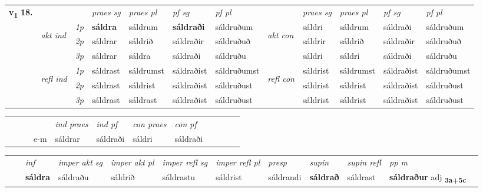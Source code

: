 \begin{tabular}{llllllllllll} \toprule
\multirow{4}{*}{{{\textbf{v{\textsubscript{1}}} \Large{\textbf{18.}}}}}  & &   &  \textit{praes sg}  & \textit{praes pl}  &\textit{ pf sg} & \textit{pf pl} &  &  \textit{praes sg}  & \textit{praes pl}  & \textit{pf sg} & \textit{pf pl } \\*
	\cmidrule{4-7} \cmidrule{9-12}
 & \multirow{3}{*}{\begin{turn}{90}\textit{akt ind}\end{turn}} & {\textit{1p}} & \textbf{sáldra} & sáldrum    & \textbf{sáldraði} & sáldruðum & \multirow{3}{*}{\begin{turn}{90}\textit{akt con}\end{turn}} &sáldri & sáldrum & sáldraði & sáldruðum\\*
& &  {\textit{2p}} &  sáldrar  & sáldrið   & sáldraðir & sáldruðuð & & sáldrir & sáldrið & sáldraðir & sáldruðuð \\*
& &  {\textit{3p}} & sáldrar & sáldra   & sáldraði & sáldruðu & & sáldri & sáldri& sáldraði & sáldruðu  \\*
\cmidrule{4-7} \cmidrule{9-12}
 &\multirow{3}{*}{\begin{turn}{90}\textit{refl ind}\end{turn}} & {\textit{1p}} & sáldrast & sáldrumst    & sáldraðist & sáldruðumst & \multirow{3}{*}{\begin{turn}{90}\textit{refl con}\end{turn}}  &sáldrist & sáldrumst & sáldraðist & sáldruðumst\\*
 &&  {\textit{2p}} &  sáldrast  & sáldrist   & sáldraðist & sáldruðust & &sáldrist & sáldrist & sáldraðist & sáldruðust \\*
& &  {\textit{3p}} & sáldrast & sáldrast   & sáldraðist & sáldruðust & & sáldrist & sáldrist& sáldraðist & sáldruðust  \\*
\cmidrule{4-7} \cmidrule{9-12}
\end{tabular}


\begin{tabular}{llllllllllll}
 & &  & &  \textit{ind praes} & \textit{ind pf} & \textit{con praes} & \textit{con pf} \\*
&  & & e-m & sáldrar & sáldraði & sáldri & sáldraði \\*
\cmidrule{5-9}
\end{tabular}


\begin{tabular}{llllllllllll}
 & & \textit{inf} & \textit{imper akt sg} & \textit{imper akt pl} & \textit{imper refl sg} & \textit{imper refl pl} & \textit{presp} & \textit{supin} & \textit{supin refl} & \textit{pp m}     \\*
  & & \textbf{sáldra} & sáldraðu  & sáldrið & sáldrastu & sáldrist & sáldrandi &  \textbf{sáldrað} & sáldrast & \textbf{sáldraður} adj \textbf{\textsubscript{3a+5c}} \\*
\cmidrule{1-12}
\end{tabular}



